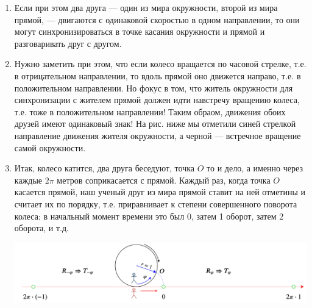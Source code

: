 \begin{enumerate}
\item Если при этом два друга --- один из мира окружности, второй из мира прямой, --- двигаются с одинаковой скоростью в одном направлении, то они могут синхронизироваться в точке касания окружности и прямой и разговаривать друг с другом.
\item Нужно заметить при этом, что если колесо вращается по часовой стрелке, т.е. в отрицательном направлении, то вдоль прямой оно движется направо, т.е. в положительном направлении. Но фокус в том, что житель окружности для синхронизации с жителем прямой должен идти навстречу вращению колеса, т.е. тоже в положительном направлении! Таким обраом, движения обоих друзей имеют одинаковый знак! На рис. ниже мы отметили синей стрелкой направление движения жителя окружности, а черной --- встречное вращение самой окружности.
\item Итак, колесо катится, два друга беседуют, точка $O$ то и дело, а именно через каждые $2\pi$ метров соприкасается с прямой. Каждый раз, когда точка $O$ касается прямой, наш ученый друг из мира прямой ставит на ней отметины и считает их по порядку, т.е. приравнивает к степени совершенного поворота колеса: в начальный момент времени это был 0, затем 1 оборот, затем 2 оборота, и т.д.

\begin{center}
\includegraphics[scale=0.2]{RundLine.png}
\end{center}


\end{enumerate}

